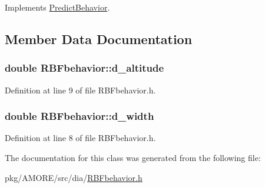 Implements \hyperlink{class_predict_behavior_a9ef84360f73784248d994fa4707c1dde}{PredictBehavior}.



\subsection{Member Data Documentation}
\hypertarget{class_r_b_fbehavior_a831ab08f316756149ff37a92098f7033}{
\subsubsection[{d\_\-altitude}]{\setlength{\rightskip}{0pt plus 5cm}double {\bf RBFbehavior::d\_\-altitude}}}
\label{class_r_b_fbehavior_a831ab08f316756149ff37a92098f7033}


Definition at line 9 of file RBFbehavior.h.

\hypertarget{class_r_b_fbehavior_a6b37a2973f5e8390e37333e81de26077}{
\subsubsection[{d\_\-width}]{\setlength{\rightskip}{0pt plus 5cm}double {\bf RBFbehavior::d\_\-width}}}
\label{class_r_b_fbehavior_a6b37a2973f5e8390e37333e81de26077}


Definition at line 8 of file RBFbehavior.h.



The documentation for this class was generated from the following file:\begin{DoxyCompactItemize}
\item 
pkg/AMORE/src/dia/\hyperlink{_r_b_fbehavior_8h}{RBFbehavior.h}\end{DoxyCompactItemize}
